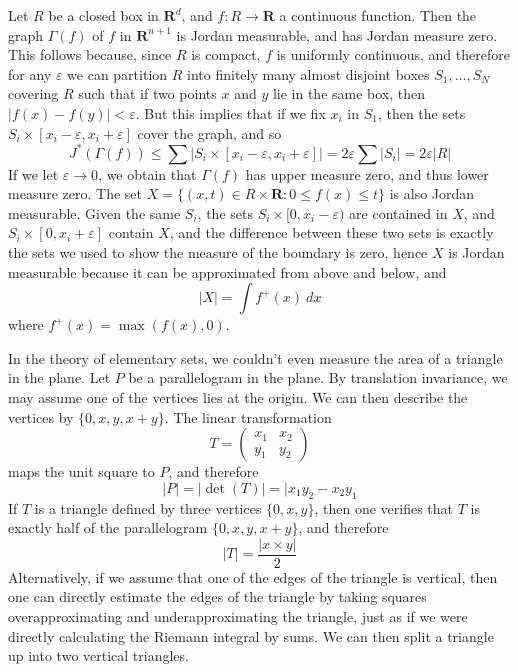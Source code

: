 \begin{example}
    Let $R$ be a closed box in $\mathbf{R}^d$, and $f: R \to \mathbf{R}$ a continuous function. Then the graph $\Gamma(f)$ of $f$ in $\mathbf{R}^{n+1}$ is Jordan measurable, and has Jordan measure zero. This follows because, since $R$ is compact, $f$ is uniformly continuous, and therefore for any $\varepsilon$ we can partition $R$ into finitely many almost disjoint boxes $S_1, \dots, S_N$ covering $R$ such that if two points $x$ and $y$ lie in the same box, then $|f(x) - f(y)| < \varepsilon$. But this implies that if we fix $x_i$ in $S_1$, then the sets $S_i \times [x_i - \varepsilon, x_i + \varepsilon]$ cover the graph, and so
    \[ J^*(\Gamma(f)) \leq \sum |S_i \times [x_i - \varepsilon, x_i + \varepsilon]| = 2 \varepsilon \sum |S_i| = 2\varepsilon |R| \]
    If we let $\varepsilon \to 0$, we obtain that $\Gamma(f)$ has upper measure zero, and thus lower measure zero. The set $X = \{ (x,t) \in R \times \mathbf{R}: 0 \leq f(x) \leq t \}$ is also Jordan measurable. Given the same $S_i$, the sets $S_i \times [0,x_i - \varepsilon)$ are contained in $X$, and $S_i \times [0,x_i+\varepsilon]$ contain $X$, and the difference between these two sets is exactly the sets we used to show the measure of the boundary is zero, hence $X$ is Jordan measurable because it can be approximated from above and below, and
    \[ |X| = \int f^+(x)\ dx \]
    where $f^+(x) = \max(f(x),0)$.
\end{example}

\begin{example}
  In the theory of elementary sets, we couldn't even measure the area of a triangle in the plane. Let $P$ be a parallelogram in the plane. By translation invariance, we may assume one of the vertices lies at the origin. We can then describe the vertices by $\{ 0, x, y, x+y \}$. The linear transformation
  \[ T = \begin{pmatrix} x_1 & x_2 \\ y_1 & y_2 \end{pmatrix} \]
  maps the unit square to $P$, and therefore
  \[ |P| = |\det(T)| = |x_1y_2 - x_2y_1 \]
  If $T$ is a triangle defined by three vertices $\{ 0, x, y \}$, then one verifies that $T$ is exactly half of the parallelogram $\{ 0, x, y, x+y \}$, and therefore
  \[ |T| = \frac{|x \times y|}{2} \]
  Alternatively, if we assume that one of the edges of the triangle is vertical, then one can directly estimate the edges of the triangle by taking squares overapproximating and underapproximating the triangle, just as if we were directly calculating the Riemann integral by sums. We can then split a triangle up into two vertical triangles.
\end{example}


